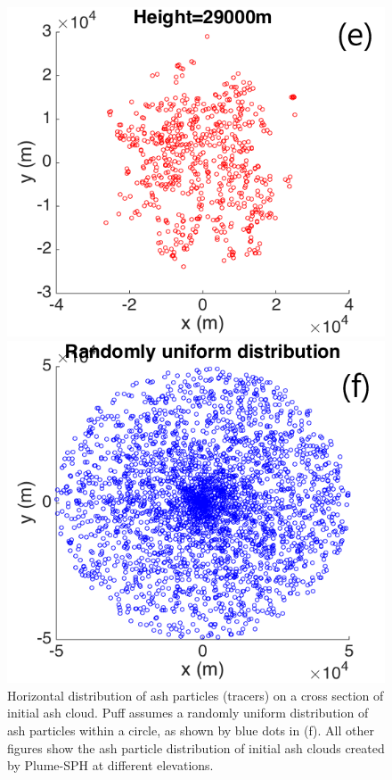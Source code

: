 \documentclass[utf8]{frontiersSCNS} %
\begin{document}
\begin{figure}[!htb]
\begin{minipage}{.325 \textwidth}
\centering
\includegraphics[width=0.99 \textwidth]{Figures/Possion-H29km-ParticleDis-h}
\end{minipage}%
\begin{minipage}{.325 \textwidth}
\centering
\includegraphics[width=0.99 \textwidth]{Figures/Possion-RDU-ParticleDis-h}
\end{minipage}%
\caption{Horizontal distribution of ash particles (tracers) on a cross section of initial ash cloud. Puff assumes a randomly uniform distribution of ash particles within a circle, as shown by blue dots in (f). All other figures show the ash particle distribution of initial ash clouds created by Plume-SPH at different elevations.}
\label{fig:initial-cloud-horizontal}
\end{figure}
\end{document}
